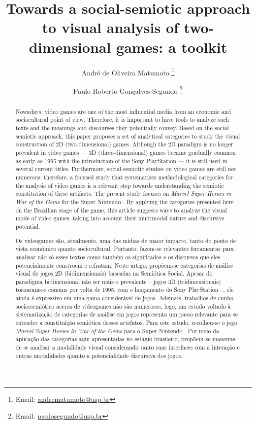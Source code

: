 \documentclass[english]{textolivre}
\title{Towards a social-semiotic approach to visual analysis of two-dimensional games: a toolkit}
\author[1]{André de Oliveira Matumoto \orcid{0000-0003-3544-3576} \thanks{Email: \href{mailto:andrematumoto@usp.br}{andrematumoto@usp.br}}}
\author[1]{Paulo Roberto Gonçalves-Segundo \orcid{0000-0002-5592-8098} \thanks{Email: \href{mailto:paulosegundo@usp.br}{paulosegundo@usp.br}}}
\affil[1]{Universidade de São Paulo, Faculdade de Filosofia, Letras e Ciências Humanas, Departamento de Letras Clássicas e Vernáculas, SP Brasil.}
\begin{document}
\maketitle

\begin{polyabstract}
\begin{abstract}
Nowadays, video games are one of the most influential media from an economic and sociocultural point of view. Therefore, it is important to have tools to analyze such texts and the meanings and discourses they potentially convey. Based on the social-semiotic approach, this paper proposes a set of analytical categories to study the visual construction of 2D (two-dimensional) games. Although the 2D paradigm is no longer prevalent in video games — 3D (three-dimensional) games became gradually common as early as 1995 with the introduction of the Sony PlayStation — it is still used in several current titles. Furthermore, social-semiotic studies on video games are still not numerous; therefore, a focused study that systematizes methodological categories for the analysis of video games is a relevant step towards understanding the semiotic constitution of these artifacts. The present study focuses on \textit{Marvel Super Heroes in War of the Gems} for the Super Nintendo \cite{capcom_marvel_1996}. By applying the categories presented here on the Brazilian stage of the game, this article suggests ways to analyze the visual mode of video games, taking into account their multimodal nature and discursive potential.

\end{abstract}

\begin{portuguese}
\begin{abstract}
Os videogames são, atualmente, uma das mídias de maior impacto, tanto do ponto de vista econômico quanto sociocultural. Portanto, fazem-se relevantes ferramentas para analisar não só esses textos como também os significados e os discursos que eles potencialmente constroem e refratam. Neste artigo, propõem-se categorias de análise visual de jogos 2D (bidimensionais) baseadas na Semiótica Social. Apesar do paradigma bidimensional não ser mais o prevalente – jogos 3D (tridimensionais) tornaram-se comuns por volta de 1995, com o lançamento do Sony PlayStation –, ele ainda é expressivo em uma gama considerável de jogos. Ademais, trabalhos de cunho sociossemiótico acerca de videogames não são numerosos; logo, um estudo voltado à sistematização de categorias de análise em jogos representa um passo relevante para se entender a constituição semiótica desses artefatos. Para este estudo, escolheu-se o jogo \textit{Marvel Super Heroes in War of the Gems} para o Super Nintendo \cite{capcom_marvel_1996}. Por meio da aplicação das categorias aqui apresentadas no estágio brasileiro, propõem-se maneiras de se analisar a modalidade visual considerando tanto suas interfaces com a interação e outras modalidades quanto a potencialidade discursiva dos jogos.


\end{abstract}
\end{portuguese}
\end{polyabstract}
\end{document}
